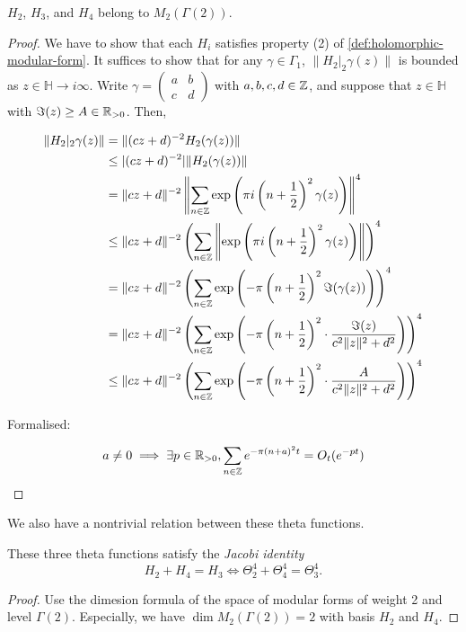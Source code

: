 \begin{lemma}\label{lemma:theta-modular}
$H_{2}$, $H_{3}$, and $H_{4}$ belong to $M_2(\Gamma(2))$.
\end{lemma}
\begin{proof}
  We have to show that each $H_i$ satisfies property (2) of \cref{def:holomorphic-modular-form}. It suffices to show that for any $\gamma \in \Gamma_1$, $\|H_2|_2\gamma(z)\|$ is bounded as $z \in \mathbb{H} \to i\infty$. Write $\gamma = \begin{pmatrix} a & b \\ c & d \end{pmatrix}$ with $a, b, c, d \in \mathbb{Z}$, and suppose that $z \in \mathbb{H}$ with $\Im(z) \geq A \in \mathbb{R}_{> 0}$. Then,

\begin{align}
  \|H_2|_2\gamma(z)\|
  &= \|(cz + d)^{-2} H_2(\gamma(z))\| \\
  &\leq |(cz + d)^{-2}| \|H_2(\gamma(z))\| \\
  &= \|cz + d\|^{-2} \left\|\sum_{n \in \mathbb{Z}} \exp\left(\pi i \left(n + \frac{1}{2}\right)^2 \gamma(z)\right)\right\|^4 \\
  &\leq \|cz + d\|^{-2} \left(\sum_{n \in \mathbb{Z}} \left\|\exp\left(\pi i \left(n + \frac{1}{2}\right)^2 \gamma(z)\right)\right\|\right)^4 \\
  &= \|cz + d\|^{-2} \left(\sum_{n \in \mathbb{Z}} \exp\left(-\pi \left(n + \frac{1}{2}\right)^2 \Im(\gamma(z))\right)\right)^4 \\
  &= \|cz + d\|^{-2} \left(\sum_{n \in \mathbb{Z}} \exp\left(-\pi \left(n + \frac{1}{2}\right)^2 \cdot \frac{\Im(z)}{c^2\|z\|^2 + d^2}\right)\right)^4 \\
  &\leq \|cz + d\|^{-2} \left(\sum_{n \in \mathbb{Z}} \exp\left(-\pi \left(n + \frac{1}{2}\right)^2 \cdot \frac{A}{c^2\|z\|^2 + d^2}\right)\right)^4 \\
\end{align}

Formalised:

\begin{align}
  a \neq 0 \implies \exists p \in \mathbb{R}_{> 0}, \sum_{n \in \mathbb{Z}} e^{-\pi (n + a)^2 t} = O_t(e^{-pt})
\end{align}

\end{proof}

We also have a nontrivial relation between these theta functions.
\begin{lemma}\label{lemma:jacobi-identity}
These three theta functions satisfy the \emph{Jacobi identity}
\begin{equation}\label{eqn:jacobi-identity}
H_{2} + H_{4} = H_{3} \Leftrightarrow \Theta_{2}^4+ \Theta_{4}^4= \Theta_{3}^4.
\end{equation}
\end{lemma}
\begin{proof}
Use the dimesion formula of the space of modular forms of weight 2 and level $\Gamma(2)$.
Especially, we have $\dim M_2(\Gamma(2)) = 2$ with basis $H_{2}$ and $H_{4}$.
\end{proof}

